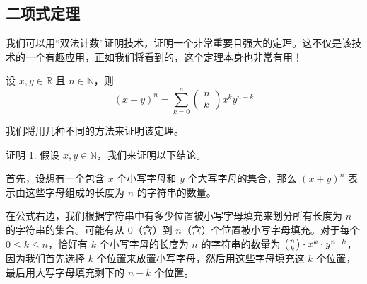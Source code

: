 
\subsection{二项式定理}\label{sec:section8.4.4}

我们可以用``双法计数''证明技术，证明一个非常重要且强大的定理。这不仅是该技术的一个有趣应用，正如我们将看到的，这个定理本身也非常有用！

\begin{theorem}\label{theorem8.4.8}
    设 $x, y \in \mathbb{R}$ 且 $n \in \mathbb{N}$，则
    \[(x+y)^n = \sum_{k=0}^{n} \begin{pmatrix}n\\k\end{pmatrix}x^ky^{n-k}\]
\end{theorem}
我们将用几种不同的方法来证明该定理。

\begin{proofs}{证明 1.}
    假设 $x, y \in \mathbb{N}$，我们来证明以下结论。

    首先，设想有一个包含 $x$ 个小写字母和 $y$ 个大写字母的集合，那么 $(x + y)^n$ 表示由这些字母组成的长度为 $n$ 的字符串的数量。

    在公式右边，我们根据字符串中有多少位置被小写字母填充来划分所有长度为 $n$ 的字符串的集合。可能有从 $0$（含）到 $n$（含）个位置被小写字母填充。对于每个 $0 \le k \le n$，恰好有 $k$ 个小写字母的长度为 $n$ 的字符串的数量为 $\big({n \atop k}\big) \cdot x^k \cdot y^{n-k}$，因为我们首先选择 $k$ 个位置来放置小写字母，然后用这些字母填充这 $k$ 个位置，最后用大写字母填充剩下的 $n - k$ 个位置。
\end{proofs}


